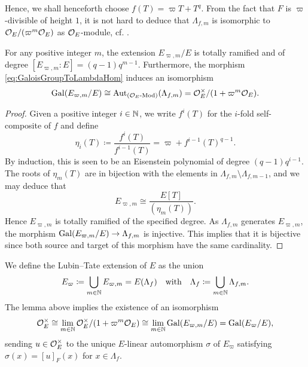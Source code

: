 \documentclass[../main.tex]{subfiles}
\begin{document}
Hence, we shall henceforth choose $f(T) = \varpi T + T^q$. From the fact that 
$F$ is $\varpi$-divisible of height $1$, it is not hard to deduce that
$\Lambda_{f,m}$ is isomorphic to $\mathcal{O}_E/(\varpi^m \mathcal{O}_E)$ as $\mathcal{O}_E$-module,
cf. \cite[Theorem 2]{LubinTateFormalMult}. 

\begin{lem}\label{lem:PropertiesOfFiniteLTExt}
  For any positive integer $m$, the extension $E_{\varpi,m}/E$ is totally ramified
  and of degree $[E_{\varpi,m}:E] = (q-1) q^{m-1}$. Furthermore, the morphism
  \eqref{eq:GaloisGroupToLambdaHom} induces an isomorphism
  \begin{equation*}
    \operatorname{Gal}(E_{\varpi, m}/E) \cong \operatorname{Aut}_{{({\mathcal{O}_E}\text-\allowbreak\mathrm{Mod})}}(\Lambda_{f,m}) = 
    \mathcal{O}_E^\times/(1 + \varpi^m \mathcal{O}_E).
  \end{equation*}
\begin{proof}
  Given a positive integer $i \in \mathbb{N}$, we write $f^i(T)$ for the $i$-fold
  self-composite of $f$ and define
  \begin{equation*}
    \eta_i(T) \coloneq \frac{f^i(T)}{f^{i-1}(T)} = \varpi + f^{i-1}(T)^{q-1}.
  \end{equation*}
  By induction, this is seen to be an Eisenstein polynomial
  of degree $(q-1) q^{i-1}$. The roots of $\eta_m(T)$ are in bijection with the 
  elements in $\Lambda_{f,m} \setminus \Lambda_{f,m-1}$, and we may deduce that 
  \begin{equation*}
    E_{\varpi,m} \cong \frac{E[T]}{(\eta_m(T))}.
  \end{equation*}
  Hence $E_{\varpi,m}$ is totally ramified of the specified degree. As
  $\Lambda_{f,m}$ generates $E_{\varpi, m}$, the morphism
  $\operatorname{Gal}(E_{\varpi,m}/E) \to \Lambda_{f,m}$ is injective. This implies that it
  is bijective since both source and target of this morphism have the same cardinality. 
\end{proof}
\end{lem}

We define the Lubin--Tate extension of $E$ as the union
\begin{equation*}
  E_\varpi \coloneq \bigcup_{m \in \mathbb{N}} E_{\varpi, m} = E(\Lambda_f) \quad
  \text{with} \quad \Lambda_f \coloneqq \bigcup_{m \in \mathbb{N}} \Lambda_{f,m}.
\end{equation*}
The lemma above implies the existence of an isomorphism
\begin{equation*}
  \mathcal{O}_E^\times \cong \lim_{m \in \mathbb{N}} \mathcal{O}_E^\times/(1 + \varpi^m \mathcal{O}_E) \cong
  \lim_{m \in \mathbb{N}} \operatorname{Gal}(E_{\varpi,m}/E) = \operatorname{Gal}(E_\varpi/E),
\end{equation*}
sending $u \in \mathcal{O}_E^\times$ to the unique $E$-linear automorphism $\sigma$ of
$E_\varpi$ satisfying $\sigma(x) = [u]_F(x)$ for $x \in \Lambda_f$. 
\end{document}

